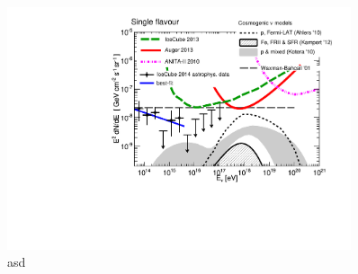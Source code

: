 	
	\begin{figure}[h!]
		\begin{center}
			\includegraphics[width=0.9\textwidth]{fig/resultadosAuger/diff_limits_and_many_models_IceCube_data_noextrap}
			\caption{asd}
			\label{fig:}
		\end{center}
	\end{figure}

	
	